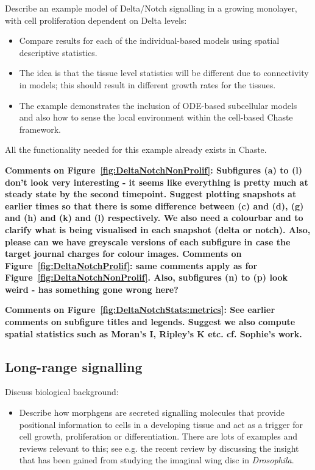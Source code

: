 \documentclass[12pt]{article}
\newcommand{\highlight}[1]{{\color{red} \bf{#1}}}
\begin{document}
\noindent Describe an example model of Delta/Notch signalling in a growing monolayer, with cell proliferation dependent on Delta levels:
\begin{itemize}
\item Compare results for each of the individual-based models using spatial descriptive statistics.
\item The idea is that the tissue level statistics will be different due to connectivity in models; this should result in different growth rates for the tissues.
\item The example demonstrates the inclusion of ODE-based subcellular models and also how to sense the local environment within the cell-based Chaste framework.
\end{itemize}

\noindent All the functionality needed for this example already exists in Chaste.

\highlight{Comments on Figure~\ref{fig:DeltaNotchNonProlif}: 
Subfigures (a) to (l) don't look very interesting - it seems like everything is pretty much at steady state by the second timepoint. 
Suggest plotting snapshots at earlier times so that there is some difference between (c) and (d), (g) and (h) and (k) and (l) respectively. 
We also need a colourbar and to clarify what is being visualised in each snapshot (delta or notch). 
Also, please can we have greyscale versions of each subfigure in case the target journal charges for colour images.
}
\highlight{Comments on Figure~\ref{fig:DeltaNotchProlif}: same comments apply as for Figure~\ref{fig:DeltaNotchNonProlif}. 
Also, subfigures (n) to (p) look weird - has something gone wrong here?
}

\highlight{Comments on Figure~\ref{fig:DeltaNotchStats:metrics}: 
See earlier comments on subfigure titles and legends. 
Suggest we also compute spatial statistics such as Moran's I, Ripley's K etc. 
cf. Sophie's work.
}


\subsection{Long-range signalling} \label{sec:morphagens}

Discuss biological background:
\begin{itemize}
\item Describe how morphgens are secreted signalling molecules that provide positional information to cells in a developing tissue and act as a trigger for cell growth, proliferation or differentiation. There are lots of examples and reviews relevant to this; see e.g. the recent review by \citet{Wartlick2011Understanding} discussing the insight that has been gained from studying the imaginal wing disc in {\it Drosophila}.
\end{itemize}
\end{document}
